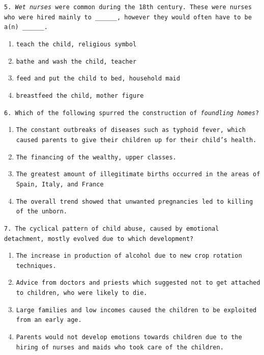 \documentclass[11pt]{scrartcl} %
\begin{document}

\texttt{5. \textit{Wet nurses} were common during the 18th century. These were nurses who were hired mainly to \_\_\_\_\_\_, however they would often have to be a(n) \_\_\_\_\_\_.}

\begin{enumerate}[label=\texttt{\textbf{\alph*)}}]
\item \texttt{teach the child, religious symbol}
\item \texttt{bathe and wash the child, teacher}
\item \texttt{feed and put the child to bed, household maid}
\item \texttt{breastfeed the child, mother figure}
\end{enumerate}


\texttt{6. Which of the following spurred the construction of \textit{foundling homes}?}

\begin{enumerate}[label=\texttt{\textbf{\alph*)}}]
\item \texttt{The constant outbreaks of diseases such as typhoid fever, which caused parents to give their children up for their child's health.}
\item \texttt{The financing of the wealthy, upper classes.}
\item \texttt{The greatest amount of illegitimate births occurred in the areas of Spain, Italy, and France}
\item \texttt{The overall trend showed that unwanted pregnancies led to killing of the unborn.}
\end{enumerate}


\texttt{7. The cyclical pattern of child abuse, caused by emotional detachment, mostly evolved due to which development?}

\begin{enumerate}[label=\texttt{\textbf{\alph*)}}]
\item \texttt{The increase in production of alcohol due to new crop rotation techniques.}
\item \texttt{Advice from doctors and priests which suggested not to get attached to children, who were likely to die.}
\item \texttt{Large families and low incomes caused the children to be exploited from an early age.}
\item \texttt{Parents would not develop emotions towards children due to the hiring of nurses and maids who took care of the children.}
\end{enumerate}
\end{document}
